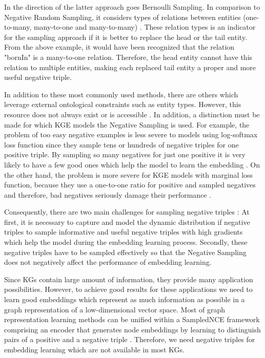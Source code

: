 In the direction of the latter approach goes Bernoulli Sampling.
In comparison to Negative Random Sampling, it considers types of relations between entities (one-to-many, many-to-one and many-to-many) \cite{zhang2021efficient}.
These relation types is an indicator for the sampling approach if it is better to replace the head or the tail entity.
From the above example, it would have been recognized that the relation "bornIn" is a many-to-one relation.
Therefore, the head entity cannot have this relation to multiple entities, making each replaced tail entity a proper and more useful negative triple.

In addition to these most commonly used methods, there are others which leverage external ontological constraints such as entity types.
However, this resource does not always exist or is accessible \cite{cai2017kbgan}.
In addition, a distinction must be made for which KGE models the Negative Sampling is used.
For example, the problem of too easy negative examples is less severe to models using log-softmax loss function since they sample tens or hundreds of negative triples for one positive triple.
By sampling so many negatives for just one positive it is very likely to have a few good ones which help the model to learn the embedding \cite{cai2017kbgan}.
On the other hand, the problem is more severe for KGE models with marginal loss function, because they use a one-to-one ratio for positive and sampled negatives and therefore, bad negatives seriously damage their performance \cite{cai2017kbgan}.

Consequently, there are two main challenges for sampling negative triples \cite{zhang2021efficient}:
At first, it is necessary to capture and model the dynamic distribution if negative triples to sample informative and useful negative triples with high gradients which help the model during the embedding learning process.
Secondly, these negative triples have to be sampled effectively  so that the Negative Sampling does not negatively affect the performance of embedding learning.




Since \acp{KG} contain large amount of information, they provide many application possibilities.
However, to achieve good results for these applications we need to learn good embeddings which represent as much information as possible in a graph representation of a low-dimensional vector space.
Most of graph representation learning methods can be unified within a \ac{SampledNCE} framework comprising an encoder that generates node embeddings by learning to distinguish pairs of a positive and a negative triple \cite{MCNS}.
Therefore, we need negative triples for embedding learning which are not available in most \acp{KG}. 

